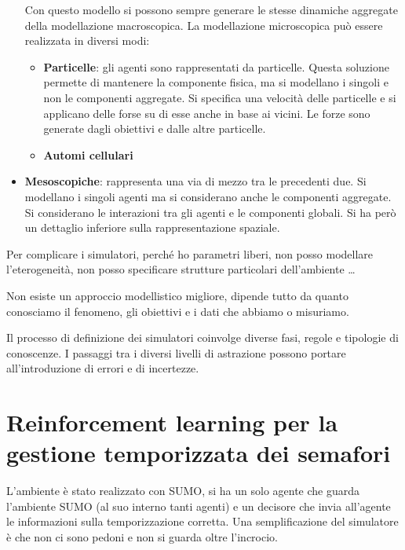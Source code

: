 \begin{itemize}
            Con questo modello si possono sempre generare le stesse dinamiche
            aggregate della modellazione macroscopica. La modellazione
            microscopica può essere realizzata in diversi modi:
            \begin{itemize}
                  \item \textbf{Particelle}: gli agenti sono rappresentati da
                        particelle. Questa soluzione permette di mantenere la
                        componente fisica, ma si modellano i singoli e non le
                        componenti aggregate. Si specifica una velocità delle
                        particelle e si applicano delle forse su di esse anche in
                        base ai vicini. Le forze sono generate dagli obiettivi e dalle
                        altre particelle.
                  \item \textbf{Automi cellulari}
            \end{itemize}
      \item \textbf{Mesoscopiche}: rappresenta una via di mezzo tra le precedenti
            due. Si modellano i singoli agenti ma si considerano anche le componenti
            aggregate. Si considerano le interazioni tra gli agenti e le componenti
            globali. Si ha però un dettaglio inferiore sulla rappresentazione
            spaziale.
\end{itemize}
Per complicare i simulatori, perché ho parametri liberi, non posso modellare
l'eterogeneità, non posso specificare strutture particolari dell'ambiente \dots
\begin{nota}
      Non esiste un approccio modellistico migliore, dipende tutto da quanto
      conosciamo il fenomeno, gli obiettivi e i dati che abbiamo o misuriamo.
\end{nota}
Il processo di definizione dei simulatori coinvolge diverse fasi, regole e
tipologie di conoscenze. I passaggi tra i diversi livelli di astrazione possono
portare all'introduzione di errori e di incertezze.

\section{Reinforcement learning per la gestione temporizzata dei semafori}
L'ambiente è stato realizzato con SUMO, si ha un solo agente che guarda l'ambiente 
SUMO (al suo interno tanti agenti) e un decisore che invia all'agente le informazioni 
sulla temporizzazione corretta. Una semplificazione del simulatore è che non ci sono 
pedoni e non si guarda oltre l'incrocio.

